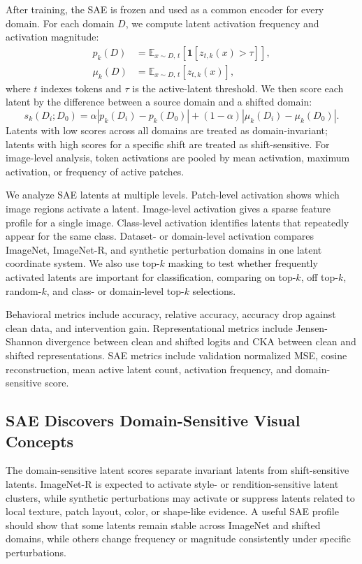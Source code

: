 \documentclass{article}
\begin{document}
After training, the SAE is frozen and used as a common encoder for every domain. For each domain $D$, we compute latent activation frequency and activation magnitude:
\begin{align}
p_k(D) &= \mathbb{E}_{x\sim D,\,t}\left[\mathbf{1}[z_{t,k}(x)>\tau]\right],\\
\mu_k(D) &= \mathbb{E}_{x\sim D,\,t}\left[z_{t,k}(x)\right],
\end{align}
where $t$ indexes tokens and $\tau$ is the active-latent threshold. We then score each latent by the difference between a source domain and a shifted domain:
\begin{equation}
s_k(D_i;D_0)=
\alpha |p_k(D_i)-p_k(D_0)|
 +(1-\alpha)|\mu_k(D_i)-\mu_k(D_0)|.
\end{equation}
Latents with low scores across all domains are treated as domain-invariant; latents with high scores for a specific shift are treated as shift-sensitive. For image-level analysis, token activations are pooled by mean activation, maximum activation, or frequency of active patches.

We analyze SAE latents at multiple levels. Patch-level activation shows which image regions activate a latent. Image-level activation gives a sparse feature profile for a single image. Class-level activation identifies latents that repeatedly appear for the same class. Dataset- or domain-level activation compares ImageNet, ImageNet-R, and synthetic perturbation domains in one latent coordinate system. We also use top-$k$ masking to test whether frequently activated latents are important for classification, comparing on top-$k$, off top-$k$, random-$k$, and class- or domain-level top-$k$ selections.

Behavioral metrics include accuracy, relative accuracy, accuracy drop against clean data, and intervention gain. Representational metrics include Jensen-Shannon divergence between clean and shifted logits and CKA between clean and shifted representations. SAE metrics include validation normalized MSE, cosine reconstruction, mean active latent count, activation frequency, and domain-sensitive score.

\subsection{SAE Discovers Domain-Sensitive Visual Concepts}

The domain-sensitive latent scores separate invariant latents from shift-sensitive latents. ImageNet-R is expected to activate style- or rendition-sensitive latent clusters, while synthetic perturbations may activate or suppress latents related to local texture, patch layout, color, or shape-like evidence. A useful SAE profile should show that some latents remain stable across ImageNet and shifted domains, while others change frequency or magnitude consistently under specific perturbations.
\end{document}
